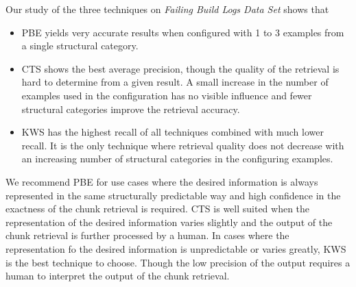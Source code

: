 \documentclass[\myrootdir/main.tex]{subfiles}
\begin{document}
Our study of the three techniques on \emph{Failing Build Logs Data Set} shows that
\begin{itemize}
  \item PBE yields very accurate results when configured with 1 to 3 examples from a single structural category.
  \item CTS shows the best average precision, though the quality of the retrieval is hard to determine from a given result.
  A small increase in the number of examples used in the configuration has no visible influence and fewer structural categories improve the retrieval accuracy.
  \item KWS has the highest recall of all techniques combined with much lower recall.
  It is the only technique where retrieval quality does not decrease with an increasing number of structural categories in the configuring examples.
\end{itemize}
We recommend PBE for use cases where the desired information is always represented in the same structurally predictable way and high confidence in the exactness of the chunk retrieval is required.
CTS is well suited when the representation of the desired information varies slightly and the output of the chunk retrieval is further processed by a human.
In cases where the representation fo the desired information is unpredictable or varies greatly, KWS is the best technique to choose.
Though the low precision of the output requires a human to interpret the output of the chunk retrieval.
\end{document}

